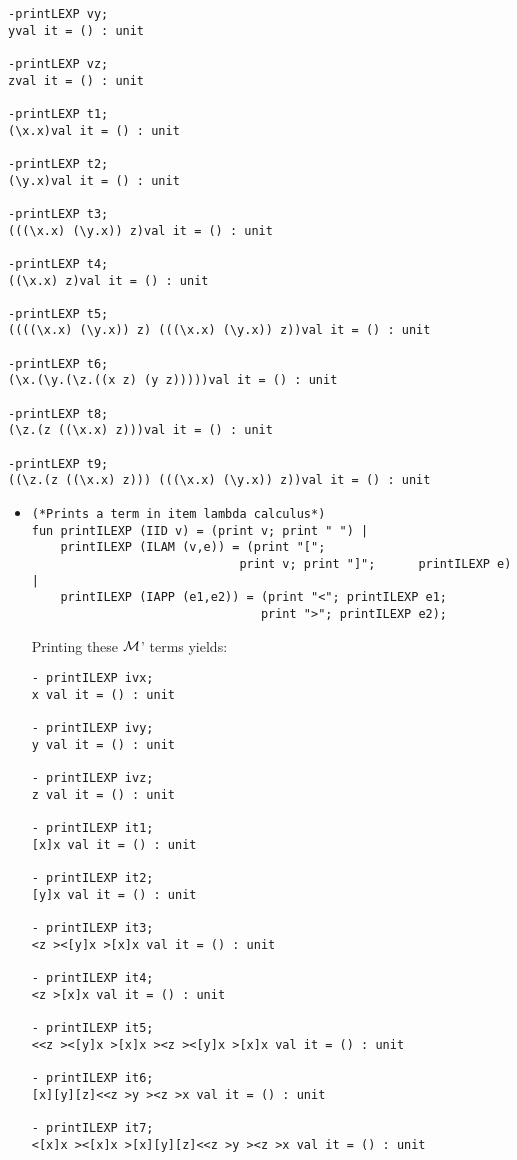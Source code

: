 \documentclass[11pt]{article}
\newcommand \cM {\cal M}
\begin{document}
\begin{enumerate}
\begin{verbatim}
-printLEXP vy;
yval it = () : unit

-printLEXP vz;
zval it = () : unit

-printLEXP t1;
(\x.x)val it = () : unit

-printLEXP t2;
(\y.x)val it = () : unit

-printLEXP t3;
(((\x.x) (\y.x)) z)val it = () : unit

-printLEXP t4;
((\x.x) z)val it = () : unit

-printLEXP t5;
((((\x.x) (\y.x)) z) (((\x.x) (\y.x)) z))val it = () : unit

-printLEXP t6;
(\x.(\y.(\z.((x z) (y z)))))val it = () : unit

-printLEXP t8;
(\z.(z ((\x.x) z)))val it = () : unit

-printLEXP t9;
((\z.(z ((\x.x) z))) (((\x.x) (\y.x)) z))val it = () : unit

	      \end{verbatim}
	      \color{red}
	      \begin{itemize}
	      	\item
	      	      \begin{verbatim}
(*Prints a term in item lambda calculus*)
fun printILEXP (IID v) = (print v; print " ") |
    printILEXP (ILAM (v,e)) = (print "[";
                             print v; print "]";      printILEXP e) |
    printILEXP (IAPP (e1,e2)) = (print "<"; printILEXP e1;
                                print ">"; printILEXP e2);

	      	      \end{verbatim}  
	      	      Printing these  $\cM$' terms yields:
	      	      \begin{verbatim}
- printILEXP ivx;
x val it = () : unit

- printILEXP ivy;
y val it = () : unit

- printILEXP ivz;
z val it = () : unit

- printILEXP it1;
[x]x val it = () : unit

- printILEXP it2;
[y]x val it = () : unit

- printILEXP it3;
<z ><[y]x >[x]x val it = () : unit

- printILEXP it4;
<z >[x]x val it = () : unit

- printILEXP it5;
<<z ><[y]x >[x]x ><z ><[y]x >[x]x val it = () : unit

- printILEXP it6;
[x][y][z]<<z >y ><z >x val it = () : unit

- printILEXP it7;
<[x]x ><[x]x >[x][y][z]<<z >y ><z >x val it = () : unit


\end{verbatim}
\end{itemize}
\end{enumerate}
\end{document}
